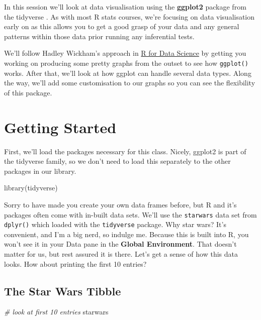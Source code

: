 \documentclass[
]{book}
\newenvironment{Shaded}{\begin{snugshade}}{\end{snugshade}}
\newcommand{\CommentTok}[1]{\textcolor[rgb]{0.56,0.35,0.01}{\textit{#1}}}
\newcommand{\FunctionTok}[1]{\textcolor[rgb]{0.00,0.00,0.00}{#1}}
\newcommand{\NormalTok}[1]{#1}
\begin{document}
In this session we'll look at data visualisation using the \textbf{ggplot2} package \citep{R-ggplot2} from the tidyverse \citep{R-tidyverse}. As with most R stats courses, we're focusing on data visualisation early on as this allows you to get a good grasp of your data and any general patterns within those data prior running any inferential tests.

We'll follow Hadley Wickham's approach in \href{http://r4ds.had.co.nz/data-visualisation.html}{R for Data Science} by getting you working on producing some pretty graphs from the outset to see how \texttt{ggplot()} works. After that, we'll look at how ggplot can handle several data types. Along the way, we'll add some customisation to our graphs so you can see the flexibility of this package.

\hypertarget{getting-started}{%
\section{Getting Started}\label{getting-started}}

First, we'll load the packages necessary for this class. Nicely, ggplot2 is part of the tidyverse family, so we don't need to load this separately to the other packages in our library.

\begin{Shaded}
\begin{Highlighting}[]
\FunctionTok{library}\NormalTok{(tidyverse)}
\end{Highlighting}
\end{Shaded}

Sorry to have made you create your own data frames before, but R and it's packages often come with in-built data sets. We'll use the \texttt{starwars} data set from \texttt{dplyr()} which loaded with the \texttt{tidyverse} package. Why star wars? It's convenient, and I'm a big nerd, so indulge me. Because this is built into R, you won't see it in your Data pane in the \textbf{Global Environment}. That doesn't matter for us, but rest assured it is there. Let's get a sense of how this data looks. How about printing the first 10 entries?

\hypertarget{the-star-wars-tibble}{%
\subsection{The Star Wars Tibble}\label{the-star-wars-tibble}}

\begin{Shaded}
\begin{Highlighting}[]
\CommentTok{\# look at first 10 entries}
\NormalTok{starwars}
\end{Highlighting}
\end{Shaded}
\end{document}
